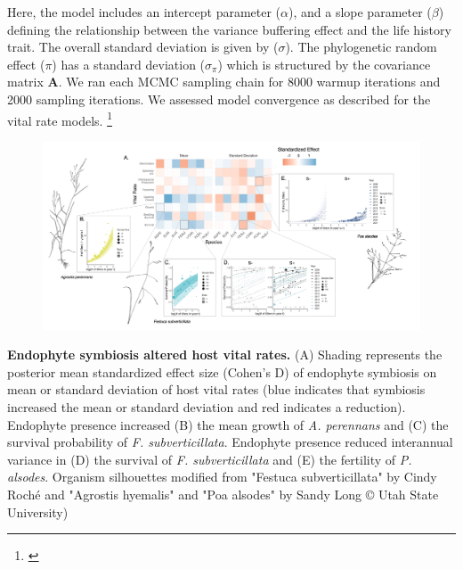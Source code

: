\documentclass[12pt]{article}
\newcommand{\tom}[2]{{\color{red}{#1}}\footnote{\textit{\color{red}{#2}}}}
\begin{document}
Here, the model includes an intercept parameter ($\alpha$), and a slope parameter ($\beta$) defining the relationship between the variance buffering effect and the life history trait. 
The overall standard deviation is given by ($\sigma$). 
The phylogenetic random effect ($\pi$) has a standard deviation ($\sigma_{\pi}$) which is structured by the covariance matrix \textbf{A}.
We ran each MCMC sampling chain for 8000 warmup iterations and 2000 sampling iterations. 
We assessed model convergence as described for the vital rate models.
\tom{}{What is i? Is that species?} 








\clearpage


\begin{figure}
	\centering
	\includegraphics[width=\linewidth]{StochDemo_fig1.png}
\end{figure}
 \textbf{Endophyte symbiosis altered host vital rates.} (A) Shading represents the posterior mean standardized effect size (Cohen's D) of endophyte symbiosis on mean or standard deviation of host vital rates (blue indicates that symbiosis increased the mean or standard deviation and red indicates a reduction). Endophyte presence increased (B) the mean growth of \emph{A. perennans} and (C) the survival probability of \emph{F. subverticillata}. Endophyte presence reduced interannual variance in (D) the survival of \emph{F. subverticillata} and (E) the fertility of \emph{P. alsodes}. Organism silhouettes modified from "Festuca subverticillata" by Cindy Roché and "Agrostis hyemalis" and "Poa alsodes" by Sandy Long © Utah State University)
\newpage
\end{document}
